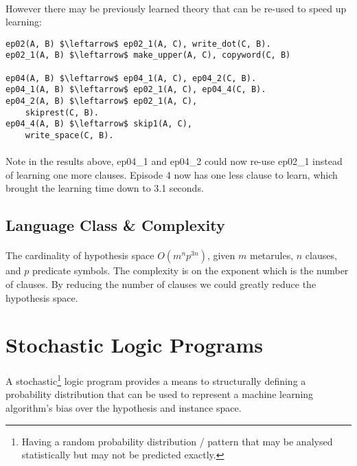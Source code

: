 \documentclass{article}
\theoremstyle{plain}
\theoremstyle{definition}
\begin{document}
\begin{multicols}{2}
\paragraph{} However there may be previously learned theory that can be re-used to speed up learning:

\begin{lstlisting}[mathescape=true]
ep02(A, B) $\leftarrow$ ep02_1(A, C), write_dot(C, B).
ep02_1(A, B) $\leftarrow$ make_upper(A, C), copyword(C, B)

ep04(A, B) $\leftarrow$ ep04_1(A, C), ep04_2(C, B).
ep04_1(A, B) $\leftarrow$ ep02_1(A, C), ep04_4(C, B).
ep04_2(A, B) $\leftarrow$ ep02_1(A, C),
	skiprest(C, B).
ep04_4(A, B) $\leftarrow$ skip1(A, C),
	write_space(C, B).
\end{lstlisting}

\paragraph{} Note in the results above, ep04\_1 and ep04\_2 could now re-use ep02\_1 instead of learning one more clauses. Episode 4 now has one less clause to learn, which brought the learning time down to 3.1 seconds.

\subsection{Language Class \& Complexity}

\paragraph{} The cardinality of hypothesis space $O(m^n p^{3n})$, given $m$ metarules, $n$ clauses, and $p$ predicate symbols. The complexity is on the exponent which is the number of clauses. By reducing the number of clauses we could greatly reduce the hypothesis space.

\section{Stochastic Logic Programs}

\paragraph{} A stochastic\footnote{Having a random probability distribution / pattern that may be analysed statistically but may not be predicted exactly.} logic program provides a means to structurally defining a probability distribution that can be used to represent a machine learning algorithm's bias over the hypothesis and instance space\cite{muggleton96}. 


\end{multicols}
\end{document}
